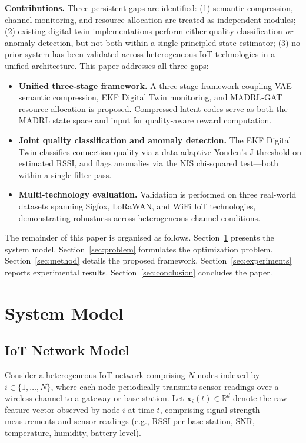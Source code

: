 \documentclass[conference]{IEEEtran}
\begin{document}
\textbf{Contributions.} Three persistent gaps are identified: (1) semantic
compression, channel monitoring, and resource allocation are treated as
independent modules; (2) existing digital twin implementations perform either
quality classification \emph{or} anomaly detection, but not both within a
single principled state estimator; (3) no prior system has been validated
across heterogeneous IoT technologies in a unified architecture. This paper
addresses all three gaps:
\begin{itemize}
\item \textbf{Unified three-stage framework.} A three-stage framework coupling
VAE semantic compression, EKF Digital Twin monitoring, and MADRL-GAT resource
allocation is proposed. Compressed latent codes serve as both the MADRL state
space and input for quality-aware reward computation.
\item \textbf{Joint quality classification and anomaly detection.}
The EKF Digital Twin classifies connection quality via a data-adaptive
Youden's J threshold on estimated RSSI, and flags anomalies via the NIS
chi-squared test---both within a single filter pass.
\item \textbf{Multi-technology evaluation.} Validation is performed on three
real-world datasets spanning Sigfox, LoRaWAN, and WiFi IoT technologies,
demonstrating robustness across heterogeneous channel conditions.
\end{itemize}

The remainder of this paper is organised as follows. Section~\ref{sec:model}
presents the system model. Section~\ref{sec:problem} formulates the
optimization problem. Section~\ref{sec:method} details the proposed
framework. Section~\ref{sec:experiments} reports experimental results.
Section~\ref{sec:conclusion} concludes the paper.

\section{System Model}
\label{sec:model}

\subsection{IoT Network Model}

Consider a heterogeneous IoT network comprising $N$ nodes indexed by
$i\in\{1,\ldots,N\}$, where each node periodically transmits sensor
readings over a wireless channel to a gateway or base station. Let
$\mathbf{x}_i(t)\in\mathbb{R}^d$ denote the raw feature vector
observed by node $i$ at time $t$, comprising signal strength measurements
and sensor readings (e.g., RSSI per base station, SNR, temperature,
humidity, battery level).
\end{document}
